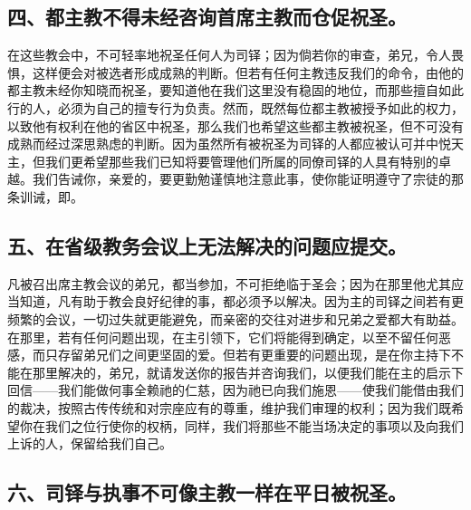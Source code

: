 
\subsection{四、都主教不得未经咨询首席主教而仓促祝圣。}

在这些教会中，不可轻率地祝圣任何人为司铎；因为倘若你的审查，弟兄，令人畏惧，这样便会对被选者形成成熟的判断。但若有任何主教违反我们的命令，由他的都主教未经你知晓而祝圣，要知道他在我们这里没有稳固的地位，而那些擅自如此行的人，必须为自己的擅专行为负责。然而，既然每位都主教被授予如此的权力，以致他有权利在他的省区中祝圣，那么我们也希望这些都主教被祝圣，但不可没有成熟而经过深思熟虑的判断。因为虽然所有被祝圣为司铎的人都应被认可并中悦天主，但我们更希望那些我们已知将要管理他们所属的同僚司铎的人具有特别的卓越。我们告诫你，亲爱的，要更勤勉谨慎地注意此事，使你能证明遵守了宗徒的那条训诫，即。\par


\subsection{五、在省级教务会议上无法解决的问题应提交。}

凡被召出席主教会议的弟兄，都当参加，不可拒绝临于圣会；因为在那里他尤其应当知道，凡有助于教会良好纪律的事，都必须予以解决。因为主的司铎之间若有更频繁的会议，一切过失就更能避免，而亲密的交往对进步和兄弟之爱都大有助益。在那里，若有任何问题出现，在主引领下，它们将能得到确定，以至不留任何恶感，而只存留弟兄们之间更坚固的爱。但若有更重要的问题出现，是在你主持下不能在那里解决的，弟兄，就请发送你的报告并咨询我们，以便我们能在主的启示下回信——我们能做何事全赖祂的仁慈，因为祂已向我们施恩——使我们能借由我们的裁决，按照古传传统和对宗座应有的尊重，维护我们审理的权利；因为我们既希望你在我们之位行使你的权柄，同样，我们将那些不能当场决定的事项以及向我们上诉的人，保留给我们自己。\par


\subsection{六、司铎与执事不可像主教一样在平日被祝圣。}

